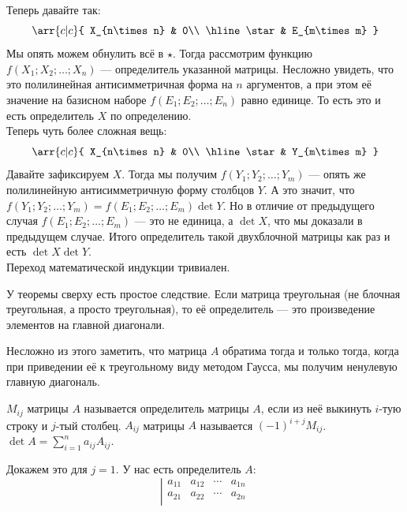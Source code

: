\documentclass{article}
\begin{document}
\begin{itemize}
\begin{Proof}
            Теперь давайте так:
            \[
            \arr{c|c}{
                X_{n\times n} & 0\\
                \hline
                \star & E_{m\times m}
            }
            \]
            Мы опять можем обнулить всё в $\star$. Тогда рассмотрим функцию $f(X_1;X_2;\ldots;X_n)$ --- определитель указанной матрицы. Несложно увидеть, что это полилинейная антисимметричная форма на $n$ аргументов, а при этом её значение на базисном наборе $f(E_1;E_2;\ldots;E_n)$ равно единице. То есть это и есть определитель $X$ по определению.\\
            Теперь чуть более сложная вещь:
            \[
            \arr{c|c}{
                X_{n\times n} & 0\\
                \hline
                \star & Y_{m\times m}
            }
            \]
            Давайте зафиксируем $X$. Тогда мы получим $f(Y_1;Y_2;\ldots;Y_m)$ --- опять же полилинейную антисимметричную форму столбцов $Y$. А это значит, что $f(Y_1;Y_2;\ldots;Y_m)=f(E_1;E_2;\ldots;E_m)\det Y$. Но в отличие от предыдущего случая $f(E_1;E_2;\ldots;E_m)$ --- это не единица, а $\det X$, что мы доказали в предыдущем случае. Итого определитель такой двухблочной матрицы как раз и есть $\det X\det Y$.\\
            Переход математической индукции тривиален.
        \end{Proof}
        \thm У теоремы сверху есть простое следствие. Если матрица треугольная (не блочная треугольная, а просто треугольная), то её определитель --- это произведение элементов на главной диагонали.
        \begin{Comment}
            Несложно из этого заметить, что матрица $A$ обратима тогда и только тогда, когда при приведении её к треугольному виду методом Гаусса, мы получим ненулевую главную диагональ.
        \end{Comment}
        \dfn {} $M_{ij}$ матрицы $A$ называется определитель матрицы $A$, если из неё выкинуть $i$-тую строку и $j$-тый столбец.
        \dfn {} $A_{ij}$ матрицы $A$ называется $(-1)^{i+j}M_{ij}$.
        \thm $\det A=\sum\limits_{i=1}^na_{ij}A_{ij}$.
        \begin{Proof}
            Докажем это для $j=1$. У нас есть определитель $A$:
            \[
            \left|\begin{matrix}
                a_{11} & a_{12} & \cdots & a_{1n}\\
                a_{21} & a_{22} & \cdots & a_{2n}\\

\end{matrix}\]
\end{Proof}
\end{itemize}
\end{document}
